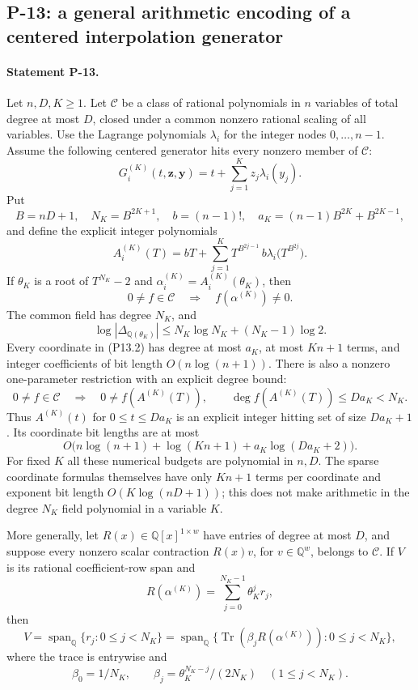\documentclass[11pt,a4paper]{article}
\theoremstyle{definition}\newtheorem{definition}{Definition}
\begin{document}
\subsection{P-13: a general arithmetic encoding of a centered interpolation generator}
\paragraph{Statement P-13.}
Let $n,D,K\geq1$. Let $\mathcal C$ be a class of rational
polynomials in $n$ variables of total degree at most $D$, closed
under a common nonzero rational scaling of all variables.
Use the Lagrange polynomials $\lambda_i$ for the integer nodes
$0,\ldots,n-1$. Assume the following centered generator hits
every nonzero member of $\mathcal C$:
\[
 G_i^{(K)}(t,\mathbf z,\mathbf y)
       =t+\sum_{j=1}^Kz_j\lambda_i(y_j).
 \tag{P13.1}
\]
Put
\[
 B=nD+1,\quad N_K=B^{2K+1},\quad b=(n-1)!,\quad
 a_K=(n-1)B^{2K}+B^{2K-1},
\]
and define the explicit integer polynomials
\[
 A_i^{(K)}(T)=bT+\sum_{j=1}^{K}
       T^{B^{2j-1}}\,b\lambda_i\bigl(T^{B^{2j}}\bigr).
 \tag{P13.2}
\]
If $\theta_K$ is a root of $T^{N_K}-2$ and
$\alpha_i^{(K)}=A_i^{(K)}(\theta_K)$, then
\[
 0\ne f\in\mathcal C
       \quad\Longrightarrow\quad f(\alpha^{(K)})\ne0.
 \tag{P13.3}
\]
The common field has degree $N_K$, and
\[
 \log|\Delta_{\mathbb Q(\theta_K)}|
       \leq N_K\log N_K+(N_K-1)\log2.
 \tag{P13.4}
\]
Every coordinate in (P13.2) has degree at most $a_K$, at most
$Kn+1$ terms, and integer coefficients of bit length
$O(n\log(n+1))$. There is also a nonzero one-parameter
restriction with an explicit degree bound:
\[
 0\ne f\in\mathcal C
   \quad\Longrightarrow\quad
 0\ne f(A^{(K)}(T)),\qquad
 \deg f(A^{(K)}(T))\leq Da_K<N_K.
 \tag{P13.5}
\]
Thus $A^{(K)}(t)$ for $0\leq t\leq Da_K$ is an explicit
integer hitting set of size $Da_K+1$. Its coordinate bit lengths
are at most
\[
 O\bigl(n\log(n+1)+\log(Kn+1)+a_K\log(Da_K+2)\bigr).
 \tag{P13.6}
\]
For fixed $K$ all these numerical budgets are polynomial in
$n,D$. The sparse coordinate formulas themselves have only
$Kn+1$ terms per coordinate and exponent bit length
$O(K\log(nD+1))$; this does not make arithmetic in the degree
$N_K$ field polynomial in a variable $K$.

More generally, let $R(x)\in\mathbb Q[x]^{1\times w}$ have
entries of degree at most $D$, and suppose every nonzero scalar
contraction $R(x)v$, for $v\in\mathbb Q^w$, belongs to
$\mathcal C$. If $V$ is its rational coefficient-row span and
\[
 R(\alpha^{(K)})=\sum_{j=0}^{N_K-1}\theta_K^j r_j,
\]
then
\[
 V=\operatorname{span}_{\mathbb Q}\{r_j:0\leq j<N_K\}
  =\operatorname{span}_{\mathbb Q}
    \{\operatorname{Tr}(\beta_jR(\alpha^{(K)})):0\leq j<N_K\},
 \tag{P13.7}
\]
where the trace is entrywise and
\[
 \beta_0=1/N_K,\qquad
 \beta_j=\theta_K^{N_K-j}/(2N_K)\quad(1\leq j<N_K).
\]
\end{document}
